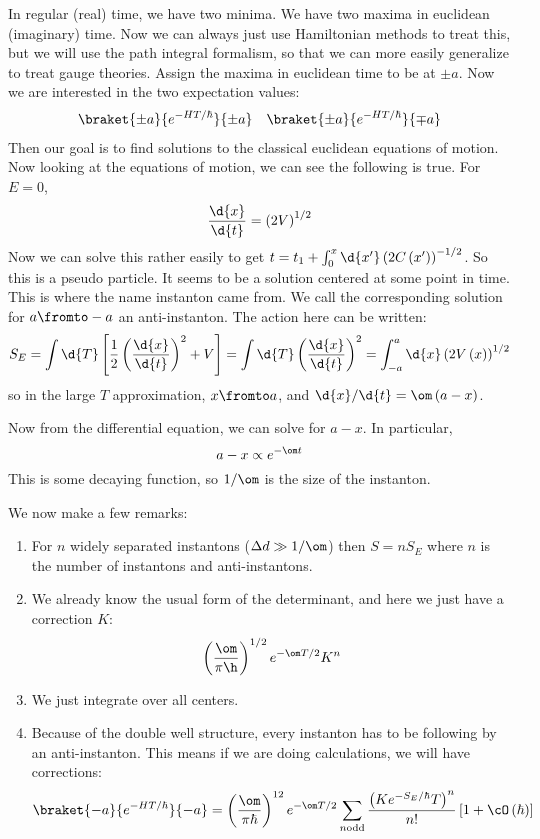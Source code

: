 \documentclass{booc}
\begin{document}
In regular (real) time, we have two minima.
We have two maxima in euclidean (imaginary) time.
Now we can always just use Hamiltonian methods to treat this, 
but we will use the path integral formalism, 
so that we can more easily generalize to treat gauge theories.
Assign the maxima in euclidean time to be at $\pm a$. 
Now we are interested in the two expectation values:
\begin{align}
\braket{\pm a}{e^{-HT / \hbar}}{\pm a}
&&
\braket{\pm a}{e^{-HT / \hbar}}{\mp a}
\end{align}
Then our goal is to find solutions to the classical euclidean equations of motion. 
Now looking at the equations of motion, we can see the following is true. 
For $E = 0$,
\begin{equation}
\frac{\d{x}}{\d{t}} = \left( 2V \right)^{1/2}
\end{equation}
Now we can solve this rather easily to get
$t = t_1 + \int_0^x \d{x'} \left( 2C\left( x' \right) \right)^{-1/2}$. 
So this is a pseudo particle. It seems to be a solution centered at some point in time.
This is where the name instanton came from.
We call the corresponding solution for $a\fromto -a$ an anti-instanton. 
The action here can be written:
\begin{equation}
S_E = \int \d{T} \left[ \frac{1}{2} \left( \frac{\d{x}}{\d{t}} \right)^2 + V \right]
=\int \d{T} \left( \frac{\d{x}}{\d{t}}\right)^2
= \int_{-a}^a \d{x}\left( 2V\left( x \right) \right)^{1/2}
\end{equation}
so in the large $T$ approximation, $x\fromto a$, and
$\d{x}/ \d{t} = \om\left( a- x \right)$. 

Now from the differential equation, we can solve for $a-x$. 
In particular, 
\begin{equation}
a- x \propto e^{-\om t}
\end{equation}
This is some decaying function, so $1/\om$ is the size of the instanton.

We now make a few remarks:
\begin{enumerate}
\item For $n$ widely separated instantons ($\Delta d \gg 1/\om$)
then $S = nS_E$ where $n$ is the number of instantons and anti-instantons.
\item We already know the usual form of the determinant, and here we just have a correction $K$:
\begin{equation}
\left( \frac{\om}{\pi \h} \right)^{1/2} e^{-\om T / 2} K^n
\end{equation}
\item We just integrate over all centers.
\item Because of the double well structure, every instanton has to be following by
an anti-instanton.
This  means if we are doing  calculations, we will have corrections:
\begin{equation}
\braket{-a}{e^{-HT / \hbar}}{-a} = \left( \frac{\om}{\pi \hbar} \right)^{12}
e^{-\om T / 2}
\sum_{n \text{odd}}
\frac{\left( K e^{-S_E/\hbar} T \right)^n}{n!} \left[ 1 + \cO\left( \hbar \right) \right]
\end{equation}
\end{enumerate}
\end{document}
